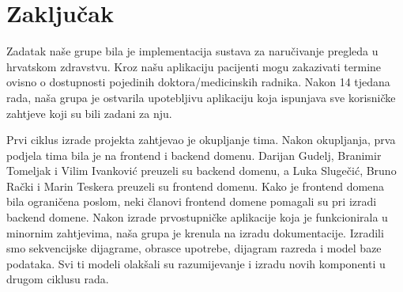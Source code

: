 \chapter{Zaključak}
		
		 \texttt{}{Zadatak naše grupe bila je implementacija sustava za naručivanje pregleda u hrvatskom zdravstvu. Kroz našu aplikaciju pacijenti mogu zakazivati termine ovisno o dostupnosti pojedinih doktora/medicinskih radnika. Nakon 14 tjedana rada, naša grupa je ostvarila upotebljivu aplikaciju koja ispunjava sve korisničke zahtjeve koji su bili zadani za nju. }
   
         \newline
   
          \texttt{}{
          Prvi ciklus izrade projekta zahtjevao je okupljanje tima. Nakon okupljanja, prva podjela tima bila je na frontend i backend domenu. Darijan Gudelj, Branimir Tomeljak i Vilim Ivanković preuzeli su backend domenu, a Luka Slugečić, Bruno Rački i Marin Teskera preuzeli su frontend domenu. Kako je frontend domena bila ograničena poslom, neki članovi frontend domene pomagali su pri izradi backend domene. Nakon izrade prvostupničke aplikacije koja je funkcionirala u minornim zahtjevima, naša grupa je krenula na izradu dokumentacije. Izradili smo sekvencijske dijagrame, obrasce upotrebe, dijagram razreda i model baze podataka. Svi ti modeli olakšali su razumijevanje i izradu novih komponenti u drugom ciklusu rada.  
          }
		
		\eject 